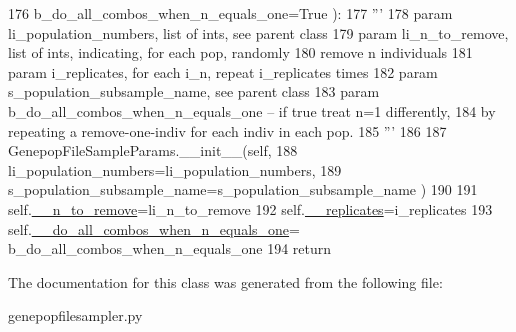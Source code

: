 \begin{DoxyCode}
176             b\_do\_all\_combos\_when\_n\_equals\_one=\textcolor{keyword}{True} ):
177         \textcolor{stringliteral}{'''}
178 \textcolor{stringliteral}{        param li\_population\_numbers, list of ints, see parent class}
179 \textcolor{stringliteral}{        param li\_n\_to\_remove, list of ints, indicating, for each pop, randomly }
180 \textcolor{stringliteral}{              remove n individuals}
181 \textcolor{stringliteral}{        param i\_replicates, for each i\_n, repeat i\_replicates times}
182 \textcolor{stringliteral}{        param s\_population\_subsample\_name, see parent class}
183 \textcolor{stringliteral}{        param b\_do\_all\_combos\_when\_n\_equals\_one -- if true treat n=1 differently,}
184 \textcolor{stringliteral}{              by repeating a remove-one-indiv for each indiv in each pop.}
185 \textcolor{stringliteral}{        '''}
186 
187         GenepopFileSampleParams.\_\_init\_\_(self, 
188                     li\_population\_numbers=li\_population\_numbers, 
189                     s\_population\_subsample\_name=s\_population\_subsample\_name )
190 
191         self.\hyperlink{classnegui_1_1genepopfilesampler_1_1GenepopFileSampleParamsRemoval_a23d601163d8118b7af9acf6acf78eecf}{\_\_n\_to\_remove}=li\_n\_to\_remove
192         self.\hyperlink{classnegui_1_1genepopfilesampler_1_1GenepopFileSampleParamsRemoval_ae2a4f45ac6b5377f749dc84a560dbf01}{\_\_replicates}=i\_replicates
193         self.\hyperlink{classnegui_1_1genepopfilesampler_1_1GenepopFileSampleParamsRemoval_a24a47d9cdac499238a1368dcc626e8a3}{\_\_do\_all\_combos\_when\_n\_equals\_one}=
      b\_do\_all\_combos\_when\_n\_equals\_one
194         \textcolor{keywordflow}{return}
\end{DoxyCode}


The documentation for this class was generated from the following file\+:\begin{DoxyCompactItemize}
\item 
genepopfilesampler.\+py\end{DoxyCompactItemize}
